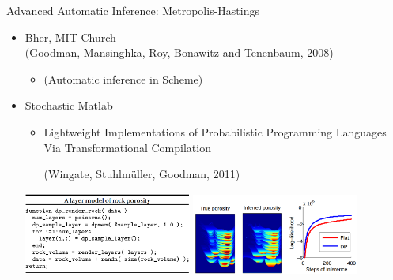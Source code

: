 
\begin{frame}{Advanced Automatic Inference: Metropolis-Hastings}
    \begin{itemize}
      \item Bher, MIT-Church
      \\ {\color{DarkBlue}(Goodman, Mansinghka, Roy, Bonawitz and Tenenbaum, 2008)}
      \begin{itemize}
         \item (Automatic inference in Scheme)
      \end{itemize}      
      \item Stochastic Matlab
    \begin{itemize}
      \item Lightweight Implementations of Probabilistic Programming Languages Via Transformational Compilation {\color{DarkBlue} 
      
      (Wingate, Stuhlm\"{u}ller, Goodman, 2011)}
    \end{itemize}      
            \includegraphics[width=5.5cm]{figures/probmatlab.png}
            \includegraphics[width=5.5cm]{figures/probmatlab2.png}
    \end{itemize}
\end{frame}

